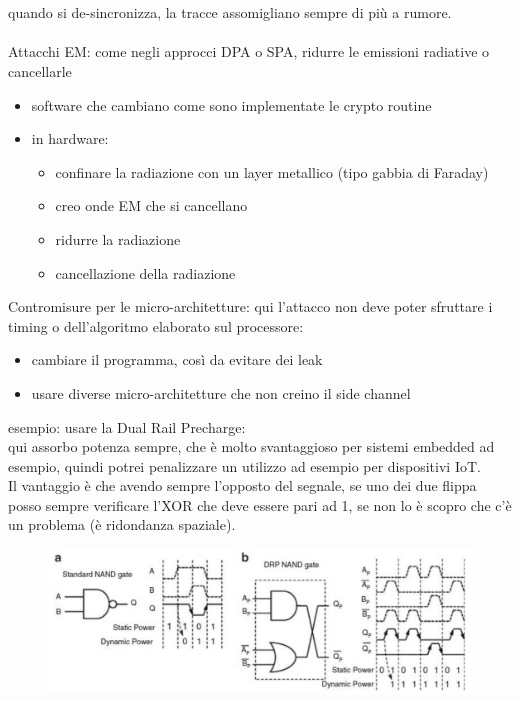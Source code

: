 \documentclass[oneside, 12pt]{extbook}
\begin{document}
\\\\quando si de-sincronizza, la tracce assomigliano sempre di più a rumore.
\\\\Attacchi EM: come negli approcci DPA o SPA, ridurre le emissioni radiative o cancellarle
\begin{itemize}
	\item software che cambiano come sono implementate le crypto routine
	\item in hardware:
	\begin{itemize}
		\item confinare la radiazione con un layer metallico (tipo gabbia di Faraday)
		\item creo onde EM che si cancellano
		\item ridurre la radiazione
		\item cancellazione della radiazione
	\end{itemize}
\end{itemize}
Contromisure per le micro-architetture: qui l'attacco non deve poter sfruttare i timing o dell'algoritmo elaborato sul processore:
\begin{itemize}
	\item cambiare il programma, così da evitare dei leak
	\item usare diverse micro-architetture che non creino il side channel
\end{itemize}
esempio: usare la Dual Rail Precharge:
\\qui assorbo potenza sempre, che è molto svantaggioso per sistemi embedded ad esempio, quindi potrei penalizzare un utilizzo ad esempio per dispositivi IoT.
\\Il vantaggio è che avendo sempre l'opposto del segnale, se uno dei due flippa posso sempre verificare l'XOR che deve essere pari ad 1, se non lo è scopro che c'è un problema (è ridondanza spaziale).\\
\begin{figure}[!h]
	\includegraphics[scale=0.4]{immagini/hardware/drpc.png}
\end{figure}
\end{document}
